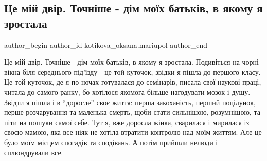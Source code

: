  
 
 
 
 

\subsection{Це мій двір. Точніше - дім моїх батьків, в якому я зростала}
\label{sec:28_04_2022.fb.kotikova_oksana.mariupol.1.tse_m_i_dv_r__tochn_}

\ifcmt
 author_begin
   author_id kotikova_oksana.mariupol
 author_end
\fi

Це мій двір. Точніше - дім моїх батьків, в якому я зростала. Подивіться на
чорні вікна біля середнього під'їзду - це той куточок, звідки я пішла до
першого класу. Це той куточок, де я по ночах готувалася до семінарів, писала
свої наукові праці, читала до самого ранку, бо хотілося якомога більше
нагодувати мозок і душу. Звідти я пішла і в \enquote{доросле} своє життя: перша
закоханість, перший поцілунок, перше розчарування та маленька смерть, щоби
стати сильнішою, розумнішою, та піти на пошуки самої себе. Тут я, вже доросла
жінка, сварилася і мирилася із своєю мамою, яка все ніяк не хотіла втратити
контролю над моїм життям. Але   це було моїм місцем спогадів та сподівань. А
потім прийшли нелюди і сплюндрували все.
